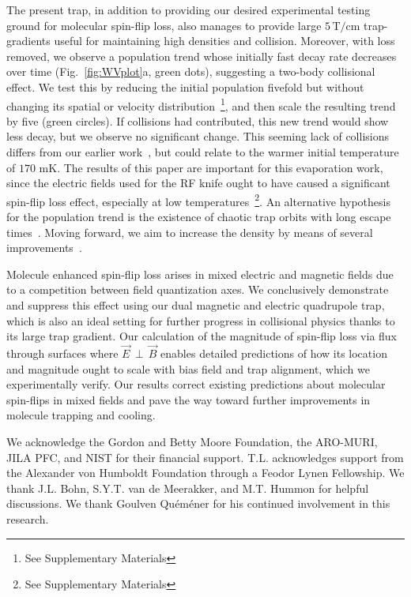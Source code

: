\documentclass[%
 reprint,
 amsmath,amssymb,
 aps,
prl,
]{revtex4-1}
\newcommand{\epb}{{$\vec{E}\,{\perp}\,\vec{B}$}}
\begin{document}
The present trap, in addition to providing our desired experimental testing ground for molecular spin-flip loss, also manages to provide large $5\,\text{T/cm}$ trap-gradients useful for maintaining high densities and collision.
Moreover, with loss removed, we observe a population trend whose initially fast decay rate decreases over time (Fig.~\ref{fig:WVplot}a, green dots), suggesting a two-body collisional effect.
We test this by reducing the initial population fivefold but without changing its spatial or velocity distribution~\footnote{See Supplementary Materials}, and then scale the resulting trend by five (green circles). 
If collisions had contributed, this new trend would show less decay, but we observe no significant change.
This seeming lack of collisions differs from our earlier work~\cite{Stuhl2012evap}, but could relate to the warmer initial temperature of $170\text{ mK}$. 
The results of this paper are important for this evaporation work, since the electric fields used for the RF knife ought to have caused a significant spin-flip loss effect, especially at low temperatures~\footnote{See Supplementary Materials}.
An alternative hypothesis for the population trend is the existence of chaotic trap orbits with long escape times~\cite{Gonzalez-Ferez2014}.
Moving forward, we aim to increase the density by means of several improvements~\cite{Even2015,Segev2017}.

Molecule enhanced spin-flip loss arises in mixed electric and magnetic fields due to a competition between field quantization axes.
We conclusively demonstrate and suppress this effect using our dual magnetic and electric quadrupole trap, which is also an ideal setting for further progress in collisional physics thanks to its large trap gradient.
Our calculation of the magnitude of spin-flip loss via flux through surfaces where \epb{} enables detailed predictions of how its location and magnitude ought to scale with bias field and trap alignment, which we experimentally verify.
Our results correct existing predictions about molecular spin-flips in mixed fields and pave the way toward further improvements in molecule trapping and cooling.

\begin{acknowledgments}
We acknowledge the Gordon and Betty Moore Foundation, the ARO-MURI, JILA PFC, and NIST for their financial support. 
T.L. acknowledges support from the Alexander von Humboldt Foundation through a Feodor Lynen Fellowship. 
We thank J.L. Bohn, S.Y.T. van de Meerakker, and M.T. Hummon for helpful discussions. 
We thank Goulven Qu\'em\'ener for his continued involvement in this research.
\end{acknowledgments}



\end{document}
